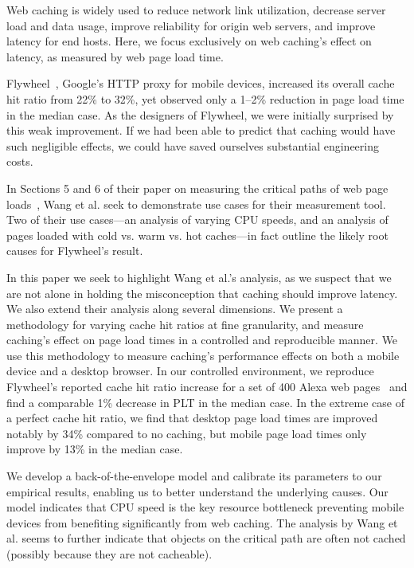 \label{intro}
Web caching is widely used to reduce network link utilization, decrease server load and data usage, improve reliability for origin web servers, and improve latency for end hosts.
Here, we focus exclusively on web caching's effect on latency, as measured by web page load time.

Flywheel~\cite{flywheel}, Google's HTTP proxy for mobile devices, increased
its overall cache hit ratio from 22\% to 32\%, yet observed only a 1--2\% reduction in page load time in the median case.
As the designers of Flywheel, we were initially surprised by this weak
improvement. If we had been able to predict that caching would have such
negligible effects, we could have saved ourselves substantial engineering costs. %

In Sections 5 and 6 of their paper on measuring the critical paths of web page 
loads~\cite{wang2013demystifying}, Wang et al. seek to demonstrate use 
cases for their measurement tool. Two of their use cases---an analysis of
varying CPU speeds, and an analysis of pages loaded with cold vs. warm vs. hot caches---in fact outline the likely root causes for Flywheel's result.

In this paper we seek to highlight Wang et al.'s analysis, as we suspect that
we are not alone in holding the misconception that caching should
improve latency. We also extend
their analysis along several dimensions. We present 
a methodology for varying cache hit ratios at fine granularity,
and measure caching's effect on page load times in a controlled and 
reproducible manner.
We use this methodology to measure caching's performance effects on both a mobile device and a desktop browser.
In our controlled environment, we reproduce Flywheel's reported cache hit
ratio increase for
a set of
400 Alexa web pages~\cite{alexa} and find a comparable 1\% decrease in PLT in the median
case.
In the extreme case of a perfect cache hit ratio, we find that desktop page load times are improved notably by 34\% compared to no caching, but mobile page load times only improve by 13\% in the median case.

We develop a back-of-the-envelope model and calibrate its parameters to
our empirical results, enabling us to better understand the underlying causes.
Our model indicates that CPU speed is the key resource bottleneck preventing mobile devices from benefiting significantly from web caching. 
The analysis by Wang et al. seems to further indicate that objects on the critical path are often not cached (possibly because they are not cacheable).


